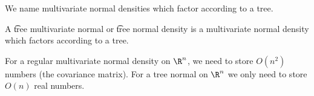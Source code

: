 

We name multivariate normal densities which factor according to a tree.


A \t{tree multivariate normal} or \t{tree normal} density is a multivariate normal density which factors according to a tree.

For a regular multivariate normal density on $\R^n$, we need to store $O(n^2)$ numbers (the covariance matrix).
For a tree normal on $\R^n$ we only need to store $O(n)$ real numbers.
